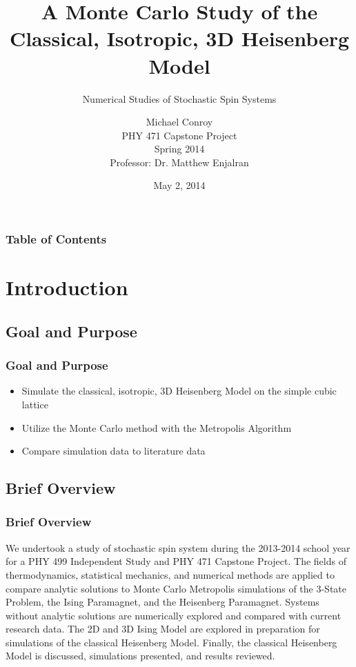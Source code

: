 \documentclass{beamer}
\title{A Monte Carlo Study of the Classical, Isotropic, 3D Heisenberg Model}
\subtitle{Numerical Studies of Stochastic Spin Systems}
\author{Michael Conroy\\
  PHY 471 Capstone Project \\
  Spring 2014 \\
  Professor: Dr. Matthew Enjalran}
\date{May 2, 2014}
\begin{document}
	\begin{frame}
	\titlepage
	\end{frame}

	\begin{frame}
		\frametitle{Table of Contents}
		\tableofcontents
	\end{frame}

	\section{Introduction}
	
	\subsection{Goal and Purpose}
  \begin{frame}
    \frametitle{Goal and Purpose}
    	\begin{itemize}
    		\item Simulate the classical, isotropic, 3D Heisenberg Model on the simple cubic lattice
    		\item Utilize the Monte Carlo method with the Metropolis Algorithm
    		\item Compare simulation data to literature data
    	\end{itemize}
  \end{frame}
  
  \subsection{Brief Overview}
  \begin{frame}
    \frametitle{Brief Overview}
    	\begin{itemize}
    		We undertook a study of stochastic spin system during the 2013-2014 school year for a PHY 499 Independent Study and PHY 471 Capstone Project. The fields of thermodynamics, statistical mechanics, and numerical methods are applied to compare analytic solutions to Monte Carlo Metropolis simulations of the 3-State Problem, the Ising Paramagnet, and the Heisenberg Paramagnet. Systems without analytic solutions are numerically explored and compared with current research data. The 2D and 3D Ising Model are explored in preparation for simulations of the classical Heisenberg Model. Finally, the classical Heisenberg Model is discussed, simulations presented, and results reviewed. 

    	\end{itemize}
  \end{frame}
\end{document}
